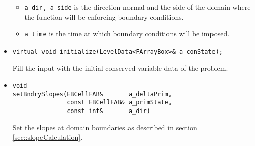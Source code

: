 \begin{itemize}
\begin{itemize}
\item \verb/a_dir, a_side/ is the direction normal and the 
        side of the domain where the function will be enforcing
        boundary conditions.
\item \verb/a_time/ is the time at which boundary conditions will
        be imposed.
\end{itemize}

\item \begin{small}\begin{verbatim}
virtual void initialize(LevelData<FArrayBox>& a_conState);
\end{verbatim}\end{small}
Fill the input with the initial conserved variable data
of the problem.

\item \begin{small}\begin{verbatim}
void 
setBndrySlopes(EBCellFAB&       a_deltaPrim,
               const EBCellFAB& a_primState,
               const int&       a_dir)
\end{verbatim}\end{small}
Set the slopes at domain boundaries as described in 
section \ref{sec::slopeCalculation}.

\end{itemize}
